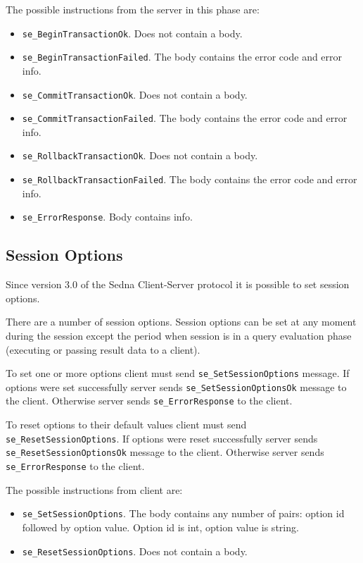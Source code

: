 \documentclass[a4paper,12pt]{article}
\begin{document}
The possible instructions from the server in this phase are:
\begin{itemize}
\item \verb!se_BeginTransactionOk!. Does not contain a body.
\item \verb!se_BeginTransactionFailed!. The body contains the error code and error info.
\item \verb!se_CommitTransactionOk!. Does not contain a body.
\item \verb!se_CommitTransactionFailed!. The body contains the error code and error info.
\item \verb!se_RollbackTransactionOk!. Does not contain a body.
\item \verb!se_RollbackTransactionFailed!. The body contains the error code and error info.
\item \verb!se_ErrorResponse!. Body contains info.
\end{itemize}

\subsection{Session Options}
Since version 3.0 of the Sedna Client-Server protocol it is possible to set session options.

There are a number of session options. Session options can be set at any moment during the session except the period when session is in a query evaluation phase (executing or passing result data to a client).

To set one or more options client must send \verb!se_SetSessionOptions! message. If options were set successfully server sends \verb!se_SetSessionOptionsOk! message to the client. Otherwise server sends \verb!se_ErrorResponse! to the client.

To reset options to their default values client must send \verb!se_ResetSessionOptions!. If options were reset successfully server sends \verb!se_ResetSessionOptionsOk! message to the client. Otherwise server sends \verb!se_ErrorResponse! to the client.

The possible instructions from client are:
\begin{itemize}
\item \verb!se_SetSessionOptions!. The body contains any number of pairs: option id followed by option value. Option id is int, option value is string.
\item \verb!se_ResetSessionOptions!. Does not contain a body.
\end{itemize}
\end{document}
